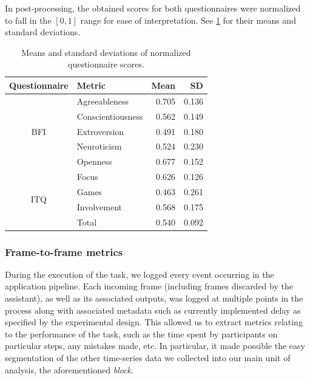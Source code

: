 \documentclass[10pt,letterpaper]{article}
\begin{document}
In post-processing, the obtained scores for both questionnaires were normalized to fall in the \( [0, 1] \) range for ease of interpretation. 
See \cref{tab:qscores} for their means and standard deviations.

\begin{table}[h]
  \centering
  \caption{Means and standard deviations of normalized questionnaire scores.}\label{tab:qscores}
  \setlength{\tabcolsep}{0pt} 
  \begin{tabular*}{\columnwidth}{@{\extracolsep{\fill}\quad}clrr@{}}
    \toprule
    \textbf{Questionnaire} & \textbf{Metric} & \textbf{Mean} & \textbf{SD}\\
    \midrule
    \multirow{5}{*}{BFI} 
        & Agreeableness &               0.705 &                  0.136 \\
        & Conscientiousness &               0.562 &                  0.149 \\
        & Extroversion &               0.491 &                  0.180 \\
        & Neuroticism &               0.524 &                  0.230 \\
        & Openness &               0.677 &                  0.152 \\
    \cline{1-4}
    \multirow{4}{*}{ITQ} 
        & Focus &               0.626 &                  0.126 \\
        & Games &               0.463 &                  0.261 \\
        & Involvement &               0.568 &                  0.175 \\
        & Total &               0.540 &                  0.092 \\
    \bottomrule
  \end{tabular*}
\end{table}


\subsubsection{Frame-to-frame metrics}
During the execution of the task, we logged every event occurring in the application pipeline.
Each incoming frame (including frames discarded by the assistant), as well as its associated outputs, was logged at multiple points in the process along with associated metadata such as currently implemented delay as specified by the experimental design.
This allowed us to extract metrics relating to the performance of the task, such as the time spent by participants on particular steps, any mistakes made, etc.
In particular, it made possible the easy segmentation of the other time-series data we collected into our main unit of analysis, the aforementioned \emph{block}.
\end{document}
